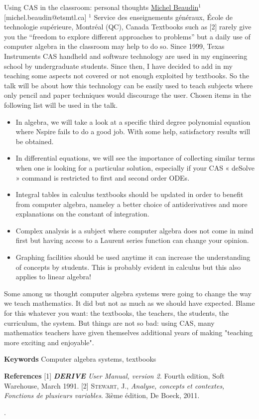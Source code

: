 \begin{abstract_online}{Using CAS in the classroom: personal thoughts}{%
        \underline{Michel Beaudin}$^{1}$}{[michel.beaudin@etsmtl.ca]
        }{%
        $^1$ Service des enseignements généraux, École de technologie supérieure, Montréal (QC), Canada \newline}
Textbooks such as [2] rarely give you the “freedom to explore different approaches to problems” but a daily use of computer algebra in the classroom may help to do so.  Since 1999, Texas Instruments CAS handheld and software technology are used in my engineering school by undergraduate students. Since then, I have decided to add in my teaching some aspects not covered or not enough exploited by textbooks.  So the talk will be about how this technology can be easily used to teach subjects where only pencil and paper techniques would discourage the user.  Chosen items in the following list will be used in the talk.
\begin{itemize}
 \item In algebra, we will take a look at a specific third degree polynomial equation where Nspire fails to do a good job.  With some help, satisfactory results will be obtained.
 \item In differential equations, we will see the importance of collecting similar terms when one is looking for a particular solution, especially if your CAS « deSolve » command is restricted to first and second order ODEs.
 \item Integral tables in calculus textbooks should be updated in order to benefit from computer algebra, nameley a better choice of antiderivatives and more explanations on the constant of integration. 
 \item Complex analysis  is a subject where computer algebra does not come in mind first but having access to a Laurent series function can change your opinion.
 \item Graphing facilities should be used anytime it can increase the understanding of concepts by students.  This is probably evident in calculus but this also applies to linear algebra!
\end{itemize}

Some among us thought computer algebra systems were going to change the way we teach mathematics.  It did but not as much as we should have expected. Blame for this whatever you want: the textbooks, the teachers, the students, the curriculum, the system.  But things are not so bad:  using CAS, many mathematics teachers have given themselves additional years of making "teaching more exciting and enjoyable".  



\textbf{Keywords} \newline{} Computer algebra systems, textbooks

\textbf{References} \newline{}
[1] \emph{\textbf{DERIVE} User Manual, version 2}. Fourth edition, Soft Warehouse, March 1991. \newline{}
[2] \textsc{Stewart, J.}, \emph{Analyse, concepts et contextes, Fonctions de plusieurs variables}. 3ième édition, De Boeck, 2011. \newline{}
\end{abstract_online}
.
    